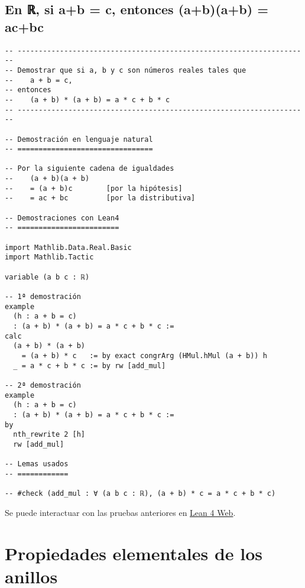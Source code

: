 \section{En ℝ, si a+b = c, entonces (a+b)(a+b) = ac+bc}
\label{sec:org4f22517}
\begin{verbatim}
-- ---------------------------------------------------------------------
-- Demostrar que si a, b y c son números reales tales que
--    a + b = c,
-- entonces
--    (a + b) * (a + b) = a * c + b * c
-- ---------------------------------------------------------------------

-- Demostración en lenguaje natural
-- ================================

-- Por la siguiente cadena de igualdades
--    (a + b)(a + b)
--    = (a + b)c        [por la hipótesis]
--    = ac + bc         [por la distributiva]

-- Demostraciones con Lean4
-- ========================

import Mathlib.Data.Real.Basic
import Mathlib.Tactic

variable (a b c : ℝ)

-- 1ª demostración
example
  (h : a + b = c)
  : (a + b) * (a + b) = a * c + b * c :=
calc
  (a + b) * (a + b)
    = (a + b) * c   := by exact congrArg (HMul.hMul (a + b)) h
  _ = a * c + b * c := by rw [add_mul]

-- 2ª demostración
example
  (h : a + b = c)
  : (a + b) * (a + b) = a * c + b * c :=
by
  nth_rewrite 2 [h]
  rw [add_mul]

-- Lemas usados
-- ============

-- #check (add_mul : ∀ (a b c : ℝ), (a + b) * c = a * c + b * c)
\end{verbatim}
Se puede interactuar con las pruebas anteriores en \href{https://lean.math.hhu.de/\#url=https://raw.githubusercontent.com/jaalonso/Calculemus2/main/src/Sia+b\_eq\_c\_entonces\_(a+b)(a+b)\_eq\_ac+bc.lean}{Lean 4 Web}.

\chapter{Propiedades elementales de los anillos}
\label{sec:org5d4ec33}

